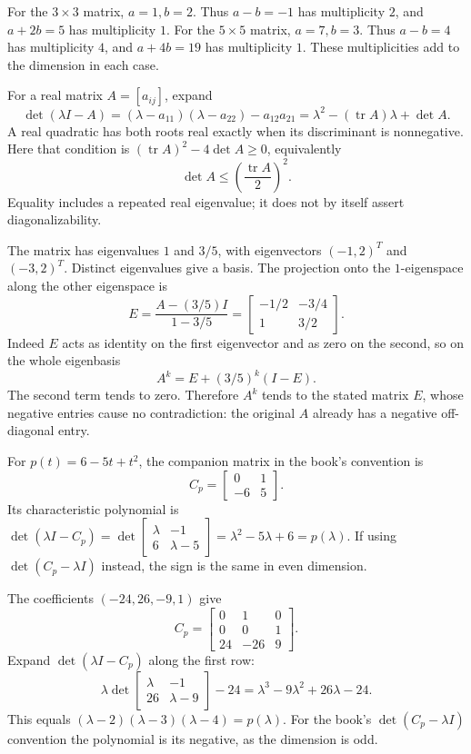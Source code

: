 For the $3\times3$ matrix, $a=1,b=2$. Thus $a-b=-1$ has
multiplicity $2$, and $a+2b=5$ has multiplicity $1$.
For the $5\times5$ matrix, $a=7,b=3$. Thus $a-b=4$ has
multiplicity $4$, and $a+4b=19$ has multiplicity $1$.
These multiplicities add to the dimension in each case.

For a real matrix $A=[a_{ij}]$, expand
\[\det(\lambda I-A)
=(\lambda-a_{11})(\lambda-a_{22})-a_{12}a_{21}
=\lambda^2-(\operatorname{tr}A)\lambda+\det A.\]
A real quadratic has both roots real exactly when its discriminant
is nonnegative. Here that condition is
$(\operatorname{tr}A)^2-4\det A\ge0$, equivalently
\[\det A\le\left(\frac{\operatorname{tr}A}{2}\right)^2.\]
Equality includes a repeated real eigenvalue; it does not by itself
assert diagonalizability.

The matrix has eigenvalues $1$ and $3/5$, with eigenvectors
$(-1,2)^T$ and $(-3,2)^T$. Distinct eigenvalues give a basis.
The projection onto the $1$-eigenspace along the other eigenspace is
\[E=\frac{A-(3/5)I}{1-3/5}
=\begin{bmatrix}-1/2&-3/4\\1&3/2\end{bmatrix}.\]
Indeed $E$ acts as identity on the first eigenvector and as zero
on the second, so on the whole eigenbasis
\[A^k=E+(3/5)^k(I-E).\]
The second term tends to zero. Therefore $A^k$ tends to the
stated matrix $E$, whose negative entries cause no contradiction:
the original $A$ already has a negative off-diagonal entry.

For $p(t)=6-5t+t^2$, the companion matrix in the book's convention is
\[C_p=\begin{bmatrix}0&1\\-6&5\end{bmatrix}.\]
Its characteristic polynomial is
$\det(\lambda I-C_p)=\det\begin{bmatrix}\lambda&-1\\6&\lambda-5\end{bmatrix}
=\lambda^2-5\lambda+6=p(\lambda)$.
If using $\det(C_p-\lambda I)$ instead, the sign is the same in
even dimension.

The coefficients $(-24,26,-9,1)$ give
\[C_p=\begin{bmatrix}0&1&0\\0&0&1\\24&-26&9\end{bmatrix}.\]
Expand $\det(\lambda I-C_p)$ along the first row:
\[\lambda\det\begin{bmatrix}\lambda&-1\\26&\lambda-9\end{bmatrix}
-24=\lambda^3-9\lambda^2+26\lambda-24.
\]
This equals $(\lambda-2)(\lambda-3)(\lambda-4)=p(\lambda)$.
For the book's $\det(C_p-\lambda I)$ convention the polynomial
is its negative, as the dimension is odd.

